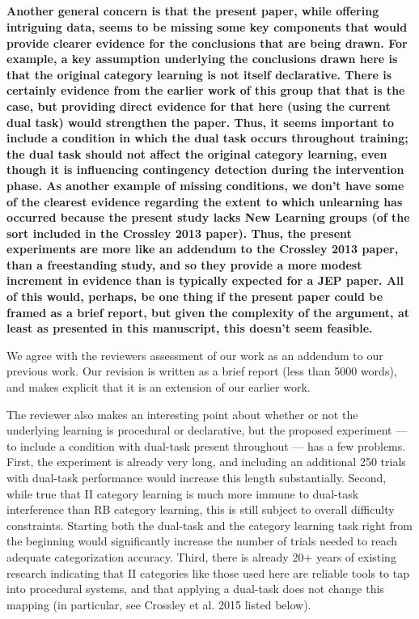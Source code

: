 \documentclass[10pt,a4paper]{article} \usepackage{amsmath} \usepackage{parskip}
\begin{document}
\subsection{} \textbf{
  Another general concern is that the present paper, while offering intriguing
  data, seems to be missing some key components that would provide clearer
  evidence for the conclusions that are being drawn. For example, a key assumption
  underlying the conclusions drawn here is that the original category learning is
  not itself declarative. There is certainly evidence from the earlier work of
  this group that that is the case, but providing direct evidence for that here
  (using the current dual task) would strengthen the paper. Thus, it seems
  important to include a condition in which the dual task occurs throughout
  training; the dual task should not affect the original category learning, even
  though it is influencing contingency detection during the intervention phase. As
  another example of missing conditions, we don't have some of the clearest
  evidence regarding the extent to which unlearning has occurred because the
  present study lacks New Learning groups (of the sort included in the Crossley
  2013 paper). Thus, the present experiments are more like an addendum to the
  Crossley 2013 paper, than a freestanding study, and so they provide a more
  modest increment in evidence than is typically expected for a JEP paper. All of
  this would, perhaps, be one thing if the present paper could be framed as a
  brief report, but given the complexity of the argument, at least as presented in
  this manuscript, this doesn't seem feasible.
}

We agree with the reviewers assessment of our work as an addendum to our
previous work. Our revision is written as a brief report (less than 5000 words),
and makes explicit that it is an extension of our earlier work.

The reviewer also makes an interesting point about whether or not the underlying
learning is procedural or declarative, but the proposed experiment --- to
include a condition with dual-task present throughout --- has a few problems.
First, the experiment is already very long, and including an additional 250
trials with dual-task performance would increase this length substantially.
Second, while true that II category learning is much more immune to dual-task
interference than RB category learning, this is still subject to overall
difficulty constraints. Starting both the dual-task and the category learning
task right from the beginning would significantly increase the number of trials
needed to reach adequate categorization accuracy. Third, there is already 20+
years of existing research indicating that II categories like those used here
are reliable tools to tap into procedural systems, and that applying a dual-task
does not change this mapping (in particular, see Crossley et al. 2015 listed
below).
\end{document}
